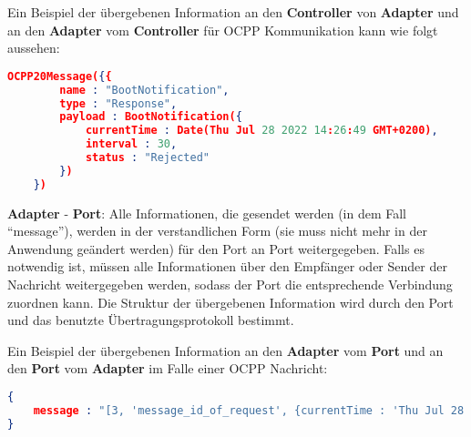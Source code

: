 \noindent Ein Beispiel der übergebenen Information an den \textbf{Controller} von \textbf{Adapter} 
und an den \textbf{Adapter} vom \textbf{Controller} für OCPP Kommunikation kann wie folgt aussehen:
\begin{lstlisting}[language=json,firstnumber=1]
    OCPP20Message({{
        name : "BootNotification",
        type : "Response",
        payload : BootNotification({
            currentTime : Date(Thu Jul 28 2022 14:26:49 GMT+0200),
            interval : 30,
            status : "Rejected"    
        })
    })
\end{lstlisting}

\newpage
\noindent \textbf{Adapter} - \textbf{Port}: Alle Informationen, 
die gesendet werden (in dem Fall ``message''), werden in der verstandlichen Form (sie muss nicht mehr in der Anwendung geändert werden)
für den Port an Port weitergegeben.
Falls es notwendig ist, müssen alle Informationen über den Empfänger oder Sender der Nachricht weitergegeben werden, 
sodass der Port die entsprechende Verbindung zuordnen kann. 
Die Struktur der übergebenen Information wird durch den Port und das benutzte Übertragungsprotokoll bestimmt. 

\noindent Ein Beispiel der übergebenen Information an den \textbf{Adapter} vom \textbf{Port} 
und an den \textbf{Port} vom \textbf{Adapter} im Falle einer OCPP Nachricht:
\begin{lstlisting}[language=json,firstnumber=1]
{
    message : "[3, 'message_id_of_request', {currentTime : 'Thu Jul 28 2022 14:26:49Z', interval : 30, status : 'Rejected'}]"
}
\end{lstlisting}
